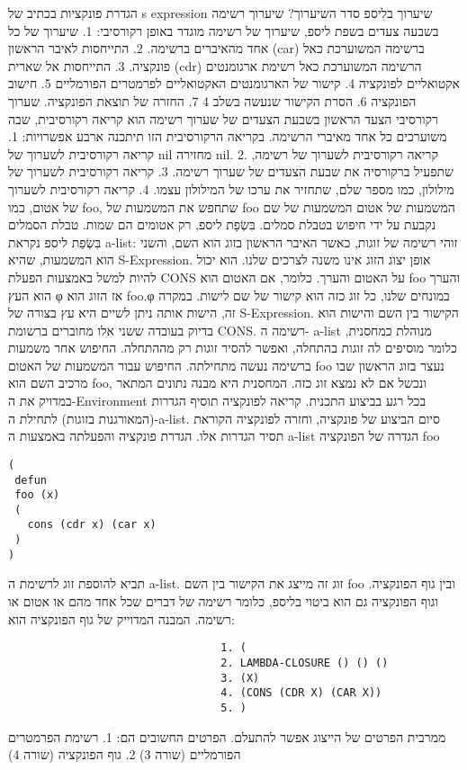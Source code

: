       הגדרת פונקציות בכתיב של s expression
      שיערוך בליספ
      סדר השיערוך?
      שיערוך רשימה בשבעה צעדים
      בשפת ליספ, שיערוך של רשימה מוגדר באופן רקורסיבי:
      1. שיערוך של כל אחד מהאיברים ברשימה.
      2. התייחסות לאיבר הראשון (car) ברשימה המשוערכת כאל פונקציה.
      3. התייחסות אל שארית (cdr) הרשימה המשוערכת כאל רשימת ארגומנטים אקטואליים לפונקציה
      4. קישור של הארגומנטים האקטואליים לפרמטרים הפורמליים
      5. חישוב הפונקציה
      6. הסרת הקישור שנעשה בשלב 4
      7. החזרה של תוצאת הפונקציה.
      שערוך רקורסיבי
      הצעד הראשון בשבעת הצעדים של שערוך רשימה הוא קריאה רקורסיבית, שבה משוערכים כל אחד מאיברי הרשימה. בקריאה הרקורסיבית הזו תיתכנה ארבע אפשרויות:
      1. קריאה רקורסיבית לשערוך של nil מחזירה nil.
      2. קריאה רקורסיבית לשערוך של רשימה, שתפעיל ברקורסיה את שבעת הצעדים של שערוך רשימה.
      3. קריאה רקורסיבית לשערוך של מילולון, כמו מספר שלם, שתחזיר את ערכו של המילולון עצמו.
      4. קריאה רקורסיבית לשערוך של אטום, כמו foo, שתחפש את המשמעות של foo
      המשמעות של אטום המשמעות של שם נקבעת על ידי חיפוש בטבלת סמלים. בִּשְׂפַת ליספ, רק
      אטומים הם שמות. טבלת הסמלים בִּשְׂפַת ליספ נקראת a-list: זוהי רשימה של זוגות, כאשר
      האיבר הראשון בזוג הוא השם, והשני הוא המשמעות, שהיא S-Expression. אופן יצוג
      הזוג אינו משנה לצרכים שלנו. הוא יכול להיות למשל באמצעות הפעלת CONS על האטום
      והערך. כלומר, אם האטום הוא foo והערך הוא העץ φ אז הזוג הוא foo.φ במונחים שלנו,
      כל זוג כזה הוא קישור של שם לישות. במקרה זה, הישות אותה ניתן לשיים היא עץ בצורה
      של S-Expression. הקישור בין השם והישות הוא בדיוק בעובדה ששני אלו מחוברים ברשומת
      CONS. רשימה ה- a-list מנוהלת כמחסנית, כלומר מוסיפים לה זוגות בהתחלה, ואפשר
      להסיר זוגות רק מההתחלה. החיפוש אחר משמעות ברשימה נעשה מתחילתה. החיפוש עבור
      המשמעות של האטום foo נעצר בזוג הראשון שבו מרכיב השם הוא foo, ונכשל אם לא נמצא
      זוג כזה. המחסנית היא מבנה נתונים המתאר במדויק את ה-Environment בכל רגע בביצוע
      התכנית. קריאה לפונקציה תוסיף הגדרות (המאורגנות בזוגות) לתחילת ה-a-list. סיום
      הביצוע של פונקציה, וחזרה לפונקציה הקוראת תסיר הגדרות אלו. הגדרת פונקציה
      והפעלתה באמצעות ה a-list הגדרה של הפונקציה foo
\begin{verbatim}
(
 defun
 foo (x)
 (
   cons (cdr x) (car x)
 )
)
\end{verbatim}

      תביא להוספת זוג לרשימת ה a-list. זוג זה מייצג את הקישור בין השם foo ובין גוף הפונקציה. וגוף הפונקציה גם הוא ביטוי בליספ, כלומר רשימה של דברים שכל אחד מהם או אטום או רשימה.
      המבנה המדוייק של גוף הפונקציה הוא:
\begin{verbatim}
                                 1. (
                                 2. LAMBDA-CLOSURE () () ()
                                 3. (X)
                                 4. (CONS (CDR X) (CAR X))
                                 5. )
\end{verbatim}
      ממרבית הפרטים של הייצוג אפשר להתעלם. הפרטים החשובים הם:
      1. רשימת הפרמטרים הפורמליים (שורה 3)
      2. גוף הפונקציה (שורה 4)

